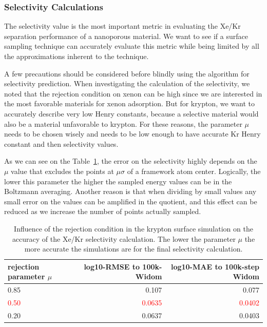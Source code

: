 \documentclass[main]{subfiles}
\begin{document}
\subsubsection{Selectivity Calculations}

The selectivity value is the most important metric in evaluating the Xe/Kr separation performance of a nanoporous material. We want to see if a surface sampling technique can accurately evaluate this metric while being limited by all the approximations inherent to the technique.

A few precautions should be considered before blindly using the algorithm for selectivity prediction. When investigating the calculation of the selectivity, we noted that the rejection condition on xenon can be high since we are interested in the most favorable materials for xenon adsorption. But for krypton, we want to accurately describe very low Henry constants, because a selective material would also be a material unfavorable to krypton. For these reasons, the parameter $\mu$ needs to be chosen wisely and needs to be low enough to have accurate Kr Henry constant and then selectivity values. 

As we can see on the Table~\ref{tab:selec_prob}, the error on the selectivity highly depends on the $\mu$ value that excludes the points at $\mu\sigma$ of a framework atom center. Logically, the lower this parameter the higher the sampled energy values can be in the Boltzmann averaging. Another reason is that when dividing by small values any small error on the values can be amplified in the quotient, and this effect can be reduced as we increase the number of points actually sampled. 

\begin{table}[ht]
  \centering
  \begin{tabular}{|l|r|r|}
  \hline
    rejection parameter $\mu$ &  log10-RMSE to 100k-Widom &   log10-MAE to 100k-step Widom \\
  \hline
      0.85 &      0.107 &   0.077 \\
      \textcolor{red}{0.50} &      \textcolor{red}{0.0635} &   \textcolor{red}{0.0402} \\
      0.20 &      0.0637 &   0.0403 \\
  \hline
  \end{tabular}
  \caption{Influence of the rejection condition in the krypton surface simulation on the accuracy of the Xe/Kr selectivity calculation. The lower the parameter $\mu$ the more accurate the simulations are for the final selectivity calculation.}\label{tab:selec_prob}
\end{table}
\end{document}
